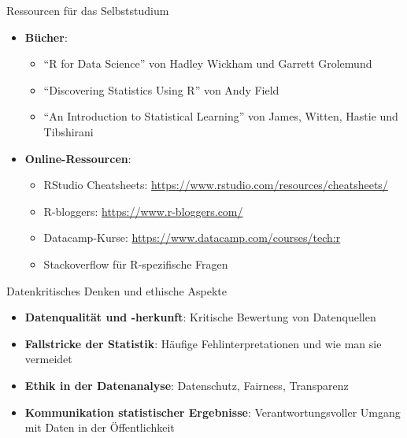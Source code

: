 \documentclass[
  ignorenonframetext,
]{beamer}
\providecommand{\tightlist}{%
  \setlength{\itemsep}{0pt}\setlength{\parskip}{0pt}}
\begin{document}
\begin{frame}{Ressourcen für das Selbststudium}
\protect{}\label{ressourcen-fuxfcr-das-selbststudium}
\begin{itemize}
\tightlist
\item
  \textbf{Bücher}:

  \begin{itemize}
  \tightlist
  \item
    ``R for Data Science'' von Hadley Wickham und Garrett Grolemund
  \item
    ``Discovering Statistics Using R'' von Andy Field
  \item
    ``An Introduction to Statistical Learning'' von James, Witten,
    Hastie und Tibshirani
  \end{itemize}
\item
  \textbf{Online-Ressourcen}:

  \begin{itemize}
  \tightlist
  \item
    RStudio Cheatsheets:
    \url{https://www.rstudio.com/resources/cheatsheets/}
  \item
    R-bloggers: \url{https://www.r-bloggers.com/}
  \item
    Datacamp-Kurse: \url{https://www.datacamp.com/courses/tech:r}
  \item
    Stackoverflow für R-spezifische Fragen
  \end{itemize}
\end{itemize}
\end{frame}

\begin{frame}{Datenkritisches Denken und ethische Aspekte}
\protect{}\label{datenkritisches-denken-und-ethische-aspekte}
\begin{itemize}
\tightlist
\item
  \textbf{Datenqualität und -herkunft}: Kritische Bewertung von
  Datenquellen
\item
  \textbf{Fallstricke der Statistik}: Häufige Fehlinterpretationen und
  wie man sie vermeidet
\item
  \textbf{Ethik in der Datenanalyse}: Datenschutz, Fairness, Transparenz
\item
  \textbf{Kommunikation statistischer Ergebnisse}: Verantwortungsvoller
  Umgang mit Daten in der Öffentlichkeit
\end{itemize}
\end{frame}
\end{document}
